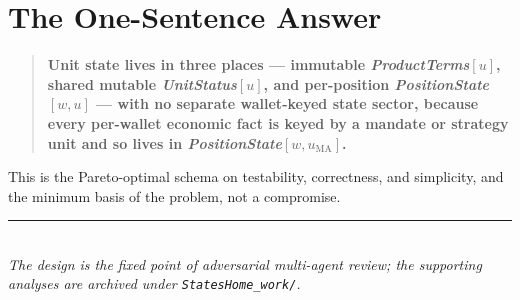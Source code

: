\documentclass[11pt,a4paper]{article}
\begin{document}


\section{The One-Sentence Answer}
\label{sec:onesentence}

\begin{quote}
\textbf{Unit state lives in three places --- immutable \emph{ProductTerms}$[u]$, shared
mutable \emph{UnitStatus}$[u]$, and per-position \emph{PositionState}$[w,u]$ --- with no
separate wallet-keyed state sector, because every per-wallet economic fact is keyed by a
mandate or strategy unit and so lives in \emph{PositionState}$[w,u_{\mathrm{MA}}]$.}
\end{quote}

\noindent This is the Pareto-optimal schema on testability, correctness, and simplicity, and
the minimum basis of the problem, not a compromise.

\vfill
\begin{center}
\rule{0.5\textwidth}{0.4pt}\\[4pt]
\textit{The design is the fixed point of adversarial multi-agent review; the supporting
analyses are archived under \texttt{StatesHome\_work/}.}
\end{center}
\end{document}
